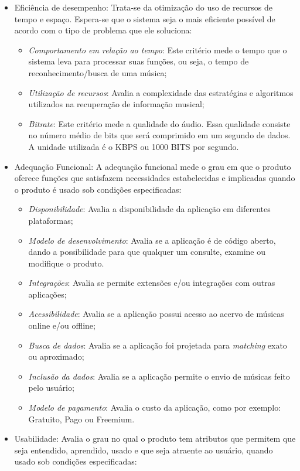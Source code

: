\begin{itemize}
    \item Eficiência de desempenho: Trata-se da otimização do uso de recursos de tempo e espaço. Espera-se que o sistema seja o mais eficiente possível de acordo com o tipo de problema que ele soluciona:
    \begin{itemize}
        \item \textit{Comportamento em relação ao tempo}: Este critério mede o tempo que o sistema leva para processar suas funções, ou seja, o tempo de reconhecimento/busca de uma música;
        \item \textit{Utilização de recursos}: Avalia a complexidade das estratégias e algoritmos utilizados na recuperação de informação musical;
        \item \textit{Bitrate}: Este critério mede a qualidade do áudio. Essa qualidade consiste no número médio de bits que será comprimido em um segundo de dados. A unidade utilizada é o KBPS ou 1000 BITS por segundo.
    \end{itemize}
    \item Adequação Funcional: A adequação funcional mede o grau em que o produto oferece funções que satisfazem necessidades estabelecidas e implicadas quando o produto é usado sob condições especificadas:
    \begin{itemize}
        \item \textit{Disponibilidade}: Avalia a disponibilidade da aplicação em diferentes plataformas;
        \item \textit{Modelo de desenvolvimento}: Avalia se a aplicação é de código aberto, dando a possibilidade para que qualquer um consulte, examine ou modifique o produto.
        \item \textit{Integrações}: Avalia se permite extensões e/ou integrações com outras aplicações;
        \item \textit{Acessibilidade}: Avalia se a aplicação possui acesso ao acervo de músicas online e/ou offline;
        \item \textit{Busca de dados}: Avalia se a aplicação foi projetada para \textit{matching} exato ou aproximado;
        \item \textit{Inclusão da dados}: Avalia se a aplicação permite o envio de músicas feito pelo usuário;
        \item \textit{Modelo de pagamento}: Avalia o custo da aplicação, como por exemplo: Gratuito, Pago ou Freemium.
    \end{itemize}
    \item Usabilidade: Avalia o grau no qual o produto tem atributos que permitem que seja entendido, aprendido, usado e que seja atraente ao usuário, quando usado sob condições especificadas:

\end{itemize}
